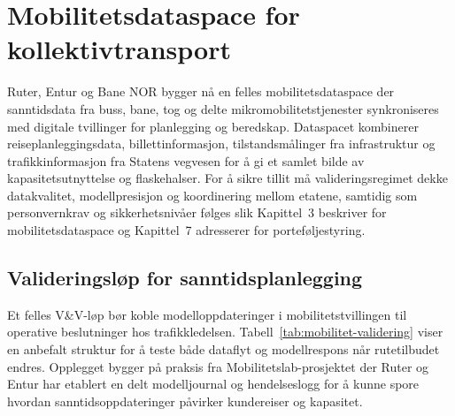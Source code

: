 \section{Mobilitetsdataspace for kollektivtransport}
Ruter, Entur og Bane NOR bygger nå en felles mobilitetsdataspace der sanntidsdata fra buss, bane, tog og delte mikromobilitetstjenester synkroniseres med digitale tvillinger for planlegging og beredskap.\citep{ruter2024mobilitetslab,entur2023dataplattform,banenor2024digitalspor} Dataspacet kombinerer reiseplanleggingsdata, billettinformasjon, tilstandsmålinger fra infrastruktur og trafikkinformasjon fra Statens vegvesen for å gi et samlet bilde av kapasitetsutnyttelse og flaskehalser.\citep{vegvesen2023beredskap} For å sikre tillit må valideringsregimet dekke datakvalitet, modellpresisjon og koordinering mellom etatene, samtidig som personvernkrav og sikkerhetsnivåer følges slik Kapittel~3 beskriver for mobilitetsdataspace og Kapittel~7 adresserer for porteføljestyring.

\subsection{Valideringsløp for sanntidsplanlegging}
Et felles V\&V-løp bør koble modelloppdateringer i mobilitetstvillingen til operative beslutninger hos trafikkledelsen. Tabell~\ref{tab:mobilitet-validering} viser en anbefalt struktur for å teste både dataflyt og modellrespons når rutetilbudet endres. Opplegget bygger på praksis fra Mobilitetslab-prosjektet der Ruter og Entur har etablert en delt modelljournal og hendelseslogg for å kunne spore hvordan sanntidsoppdateringer påvirker kundereiser og kapasitet.\citep{ruter2024mobilitetslab,entur2023dataplattform}

